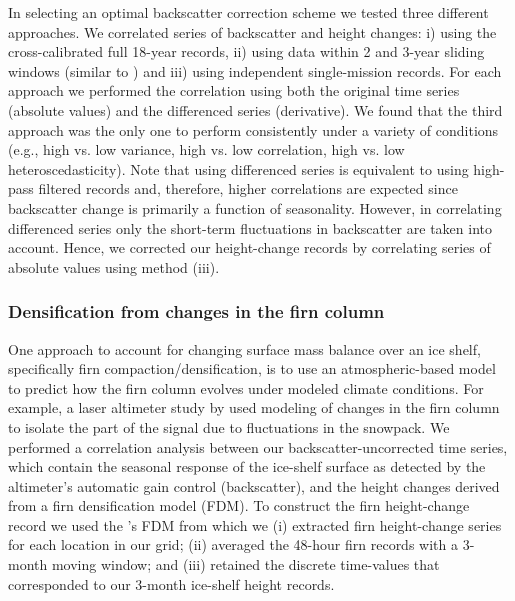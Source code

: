 In selecting an optimal backscatter correction scheme we tested three different approaches. We correlated series of backscatter and height changes: i) using the cross-calibrated full 18-year records, ii) using data within 2 and 3-year sliding windows (similar to \textcite{Khvorostovsky2012}) and iii) using independent single-mission records. For each approach we performed the correlation using both the original time series (absolute values) and the differenced series (derivative). We found that the third approach was the only one to perform consistently under a variety of conditions (e.g., high vs. low variance, high vs. low correlation, high vs. low heteroscedasticity). Note that using differenced series is equivalent to using high-pass filtered records and, therefore, higher correlations are expected since backscatter change is primarily a function of seasonality. However, in correlating differenced series only the short-term fluctuations in backscatter are taken into account. Hence, we corrected our height-change records by correlating series of absolute values using method (iii).

\subsubsection{Densification from changes in the firn column}

One approach to account for changing surface mass balance over an ice shelf, specifically firn compaction/densification, is to use an atmospheric-based model to predict how the firn column evolves under modeled climate conditions. For example, a laser altimeter study by \textcite{Pritchard2012} used modeling of changes in the firn column to isolate the part of the signal due to fluctuations in the snowpack. We performed a correlation analysis between our backscatter-uncorrected time series, which contain the seasonal response of the ice-shelf surface as detected by the altimeter's automatic gain control (backscatter), and the height changes derived from a firn densification model (FDM). To construct the firn height-change record we used the \textcite{Ligtenberg2011}'s FDM from which we (i) extracted firn height-change series for each location in our grid; (ii) averaged the 48-hour firn records with a 3-month moving window; and (iii) retained the discrete time-values that corresponded to our 3-month ice-shelf height records.

